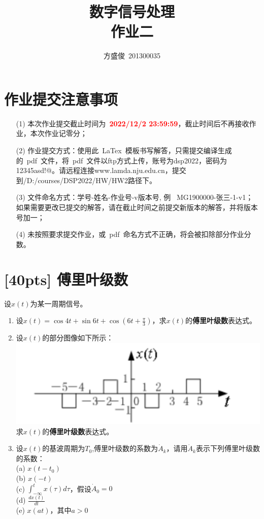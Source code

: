 \documentclass[a4paper,UTF8]{article}
\numberwithin{equation}{section}
\begin{document}
\title{数字信号处理\\
作业二}
\author{方盛俊\, 201300035} 
\maketitle

\section*{作业提交注意事项}
\begin{tcolorbox}
\begin{enumerate}
  \item[(1)] 本次作业提交截止时间为~\textcolor{red}{\textbf{2022/12/2  23:59:59}}，截止时间后不再接收作业，本次作业记零分；
  \item[(2)] 作业提交方式：使用此~LaTex~模板书写解答，只需提交编译生成的~pdf~文件，将~pdf~文件以ftp方式上传，账号为dsp2022，密码为12345asd!@。请远程连接www.lamda.nju.edu.cn，提交到/D:/courses/DSP2022/HW/HW2路径下。
  \item[(3)] 文件命名方式：学号-姓名-作业号-v版本号, 例~ MG1900000-张三-1-v1；如果需要更改已提交的解答，请在截止时间之前提交新版本的解答，并将版本号加一；
  \item[(4)] 未按照要求提交作业，或~pdf~命名方式不正确，将会被扣除部分作业分数。

\end{enumerate}
\end{tcolorbox}


\newpage
\section{[40pts] 傅里叶级数}
设$x(t)$为某一周期信号。
\begin{enumerate}[(1)]
	\item 设$x(t)=\cos4t+\sin6t+\cos(6t+\displaystyle\frac{\pi}{3}) $，求$x(t)$的\textbf{傅里叶级数}表达式。
	\item 设$x(t)$的部分图像如下所示：\\
	\includegraphics[scale=0.4]{1.png}\\
	求$x(t)$的\textbf{傅里叶级数}表达式。
	\item 设$x(t)$的基波周期为$T_0$,傅里叶级数的系数为$\dot{A}_k$，请用$\dot{A}_k$表示下列傅里叶级数的系数：\\
	(a) $x(t-t_0)$\\
	(b) $x(-t)$\\
	(c) $\displaystyle\int_{-\infty}^tx(\tau)d\tau$，假设$\dot{A}_0=0$\\
	(d) $\displaystyle\frac{dx(t)}{dt}$\\
	(e) $x(at)$，其中$a>0$
\end{enumerate}
\end{document}
